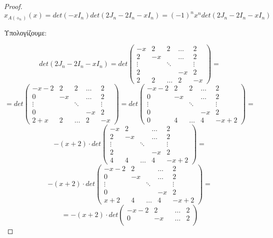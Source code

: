 \documentclass[oneside,a4paper]{article}
\begin{document}
\begin{proof}
	$$x_{A(\diamond_n)} (x) = det(-xI_n)det(2J_n - 2I_n - xI_n) = (-1)^n x^n det(2J_n - 2I_n - xI_n) $$

	Υπολογίζουμε:

	$$det(2J_n - 2I_n - xI_n) = det \begin{pmatrix}
		-x & 2 & 2 & \ldots & 2 \\
		 2 & -x & & \ldots & 2 \\
		\vdots & &  \ddots & &  \vdots \\
		 2 &  & & -x &2 \\
		 2 & 2 & \ldots & 2 & -x 
	\end{pmatrix} = $$
	$$ = det \begin{pmatrix}
		-x-2 & 2 & 2 & \ldots & 2 \\
		 0 & -x & & \ldots & 2 \\
		\vdots & &  \ddots & &  \vdots \\
		 0 &  & & -x &2 \\
		 2+x & 2 & \ldots & 2 & -x 
	\end{pmatrix} = det\begin{pmatrix}
		-x-2 & 2 & 2 & \ldots & 2 \\
		 0 & -x & & \ldots & 2 \\
		\vdots & &  \ddots & &  \vdots \\
		 0 &  & & -x &2 \\
		 0 & 4 & \ldots & 4 & -x+2 
	\end{pmatrix} = 
	$$ %
	$$ - (x+2) \cdot det \begin{pmatrix}
		-x & 2 & & \ldots & 2 \\
		 2 & -x & & \ldots & 2 \\
		\vdots & &  \ddots & &  \vdots \\
		 2  &  & & -x &2 \\
		 4 & 4 & \ldots & 4 & -x+2 
	\end{pmatrix} =$$
	$$ -(x+2) \cdot det \begin{pmatrix}
		-x-2 & 2 & & \ldots & 2 \\
		 0 & -x & & \ldots & 2 \\
		\vdots & &  \ddots & &  \vdots \\
		 0  &  & & -x &2 \\
		 x+2 & 4 & \ldots & 4 & -x+2 
	\end{pmatrix} = $$
	$$ = -(x+2) \cdot det \begin{pmatrix}
		-x-2 & 2 & & \ldots & 2 \\
		 0 & -x & & \ldots & 2 \\

\end{pmatrix}$$
\end{proof}
\end{document}
